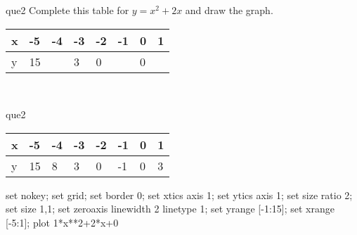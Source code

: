 \documentclass[13.5pt, varwidth=true]{beamer}
\begin{document}
\begin{frame}[shrink=19,fragile]
	\begin{beamercolorbox}[rounded=true, left, shadow=true,wd=14.8cm]{que2}
		 Complete this table for $y = x^{2} + 2x$ and draw the graph. \\[0.3cm] \renewcommand{\arraystretch}{1.2}\begin{tabular}{|C|C|C|C|C|C|C|C|} \hline x & -5 & -4 & -3 & -2 & -1 & 0 & 1 \\ \hline y & 15 &  & 3 & 0 &  & 0 & \\ \hline \end{tabular}\\[0.3cm]
	\end{beamercolorbox}
\end{frame}
\begin{frame}[shrink=19,fragile]
	\begin{beamercolorbox}[rounded=true, left, shadow=true,wd=14.8cm]{que2}
		\renewcommand{\arraystretch}{1.2}\begin{tabular}{|C|C|C|C|C|C|C|C|} \hline x & -5 & -4 & -3 & -2 & -1 & 0 & 1 \\ \hline y & 15 & 8 & 3 & 0 & -1 & 0 & 3\\ \hline \end{tabular}\begin{gnuplot}[terminal=pdf] set nokey; set grid; set border 0; set xtics axis 1; set ytics axis 1; set size ratio 2; set size 1,1; set zeroaxis linewidth 2 linetype 1; set yrange [-1:15]; set xrange [-5:1]; plot 1*x**2+2*x+0 \end{gnuplot}
	\end{beamercolorbox}
\end{frame}
\end{document}
